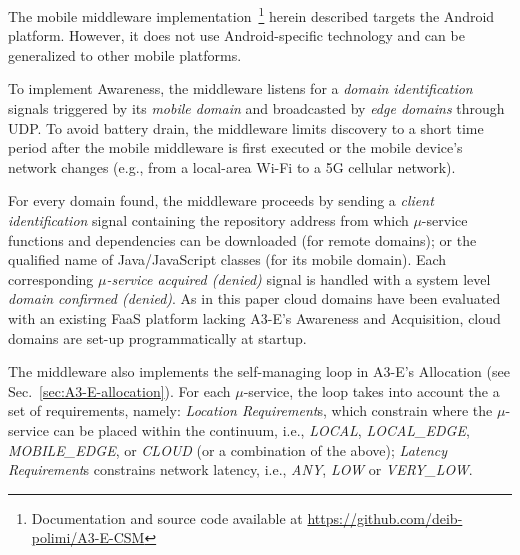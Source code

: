 
The mobile middleware implementation~\footnote{Documentation and source code available at \url{https://github.com/deib-polimi/A3-E-CSM}} herein described targets the Android platform. However, it does not use Android-specific technology and can be generalized to other mobile platforms.

To implement Awareness, the middleware listens for a \textit{domain identification} signals triggered by its \textit{mobile domain} and broadcasted by \textit{edge domains} through UDP. To avoid battery drain, the middleware limits discovery to 
a short time period after the mobile middleware is first executed or the mobile device's network changes (e.g., from a local-area Wi-Fi to a 5G cellular network). 

For every domain found, the middleware proceeds by sending a \textit{client identification} signal containing the repository address from which $\mu$-service functions and dependencies can be downloaded (for remote domains); or the qualified name of Java/JavaScript classes (for its mobile domain). Each corresponding \textit{$\mu$-service acquired (denied)} signal is handled with a system level \textit{domain confirmed (denied)}. As in this paper cloud domains have been evaluated with an existing FaaS platform lacking A3-E's Awareness and Acquisition, cloud domains are set-up programmatically at startup.




The middleware also implements the self-managing loop in A3-E's Allocation (see Sec.~\ref{sec:A3-E-allocation}). For each $\mu$-service, the loop takes into account the a set of requirements,
namely: \textit{Location Requirement}s, which constrain where the $\mu$-service can be placed within the continuum, i.e., \textit{LOCAL}, \textit{LOCAL\_EDGE}, \textit{MOBILE\_EDGE}, or \textit{CLOUD} (or a combination of the above); \textit{Latency Requirement}s constrains network latency, i.e., \textit{ANY}, \textit{LOW} or \textit{VERY\_LOW}.

